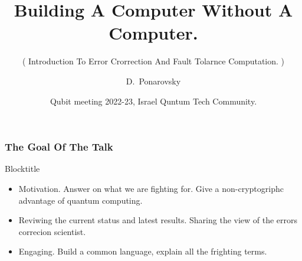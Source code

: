 \documentclass{beamer}
\title[Building A Computer Without A Computer] %
{Building A Computer Without A Computer.}
\subtitle{ ( Introduction To Error Crorrection And Fault Tolarnce Computation. ) }
\author[D.~Ponarovsky] %
	{D.~Ponarovsky\inst{1}}
\institute[HUJI] %
	{ \inst{1} Faculty of Computer Science\newline
	  Hebrew University of Jerusalem
	}
\date[2022-23] %
{Qubit meeting 2022-23, Israel Quntum Tech Community.}
\begin{document}

     \begin{frame}
     \maketitle
   \end{frame}

   \begin{frame}
     \frametitle{ The Goal Of The Talk  }

   \begin{exampleblock}{ Blocktitle } 
     \begin{itemize}
       \item<1-> Motivation. Answer on what we are fighting for. Give a non-cryptogriphc advantage of quantum computing.  
       \item<2-> Reviwing the current status and latest results. Sharing the view of the errors correcion scientist.    
       \item<3-> Engaging. Build a common language, explain all the frighting terms.  
    \end{itemize}
  \end{exampleblock}
   \end{frame}
\usebackgroundtemplate{ }    %
\end{document}
